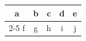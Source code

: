 \documentclass{article}
\let\cline\cmidrule
\begin{document}
\begin{tabular}{ccccc}
a & b & c & d & e \\
\cline{2-5}
f & g & h & i & j \\
\end{tabular}
\end{document}
